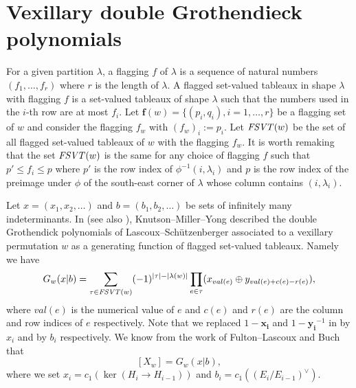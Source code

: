 \documentclass[12pt, reqno,sumlimits]{amsart}
\theoremstyle{definition}
\numberwithin{equation}{section}
\newcommand{\bff}{{\mathbf f }}
\newcommand{\FSVT}{{\it FSVT}}
\begin{document}
\section{Vexillary double Grothendieck polynomials}\label{SecGro}
For a given partition $\lambda$, a flagging $f$ of $\lambda$ is a sequence of natural numbers $(f_1,\dots,f_r)$ where $r$ is the length of $\lambda$. A flagged set-valued tableaux in shape $\lambda$ with flagging $f$ is a set-valued tableaux of shape $\lambda$ such that the numbers used in the $i$-th row are at most $f_i$. Let $\bff(w)=\{(p_i,q_i), i=1,\dots, r\}$ be a flagging set of $w$ and consider the flagging $f_w$ with $(f_w)_i:=p_i$. Let $\FSVT(w)$ be the set of all flagged set-valued tableaux of $w$ with the flagging $f_w$. It is worth remaking that the set $\FSVT(w)$ is the same for any choice of flagging $f$ such that $p'\leq f_i\leq p$ where $p'$ is the row index of $\phi^{-1}(i,\lambda_i)$ and $p$ is the row index of the preimage under $\phi$ of the south-east corner of $\lambda$ whose column contains $(i,\lambda_i)$. 

Let $x=(x_1,x_2,\dots )$ and $b=(b_1,b_2,\dots)$ be sets of infinitely many indeterminants. In \cite{KnutsonMillerYong} (see also \cite{KnutsonMillerYong2}), Knutson--Miller--Yong described the double Grothendick polynomials of Lascoux--Sch{\"u}tzenberger \cite{LascouxSchutzenberger3} associated to a vexillary permutation $w$ as a generating function of flagged set-valued tableaux. Namely we have
\[
G_w(x|b) = \sum_{\tau \in \FSVT(w)} (-1)^{|\tau| - |\lambda(w)|} \prod_{e\in \tau} (x_{val(e)} \oplus y_{val(e) + c(e)-r(e)}),
\]
where $val(e)$ is the numerical value of $e$ and $c(e)$ and $r(e)$ are the column and row indices of $e$ respectively. Note that we replaced $1-\mathbf{x_i}$ and $1-\mathbf{y_i}^{-1}$ in \cite{KnutsonMillerYong} by $x_i$ and  by $b_i$ respectively. We know from the work of Fulton--Lascoux \cite{FultonLascoux} and Buch \cite{BuchQuiver} that 
\begin{equation}\label{XG}
[X_w] = G_w(x|b),
\end{equation}
where we set $x_i = c_1(\ker(H_i\to H_{i-1}))$ and $b_i=c_1((E_i/E_{i-1})^{\vee})$. 
\end{document}
